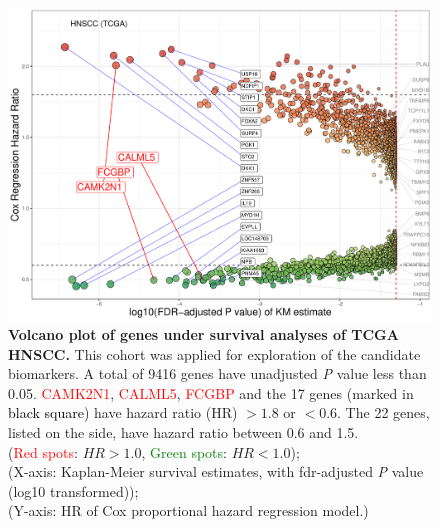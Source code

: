 \documentclass[jpm,article,submit,moreauthors,pdftex]{Definitions/mdpi}
\newcommand{\bcaption}[2]{\caption{\textbf{#1} #2}}
\begin{document}
\begin{figure}
    \centering
    \includegraphics[width=13cm]{Rplot_TCGA_HNSCC_CoxHR_CAMK2N1_top3FDRKM.pdf}
    \bcaption{Volcano plot of genes under survival analyses of TCGA HNSCC.}{
    This cohort was applied for exploration of the candidate biomarkers.
    A total of 9416 genes have %
    unadjusted \textit{P} value less than 0.05.
    \textcolor{red}{CAMK2N1}, \textcolor{red}{CALML5}, \textcolor{red}{FCGBP} and the 17 genes (marked in \textcolor{black}{black square}) have hazard ratio (HR) $> 1.8$ or $< 0.6$.
    The 22 genes, listed on the side, have hazard ratio between 0.6 and 1.5.\\
    (\textcolor{red}{Red spots}: $HR > 1.0$,
    \textcolor{green}{Green spots}: $HR < 1.0$);\\
    (X-axis: Kaplan-Meier survival estimates, with \acrshort{fdr}-adjusted \textit{P} value (log10 transformed));\\
    (Y-axis: HR of Cox proportional hazard regression model.)
    }
    \label{fig:hazards3}
\end{figure}
\clearpage
\end{document}
